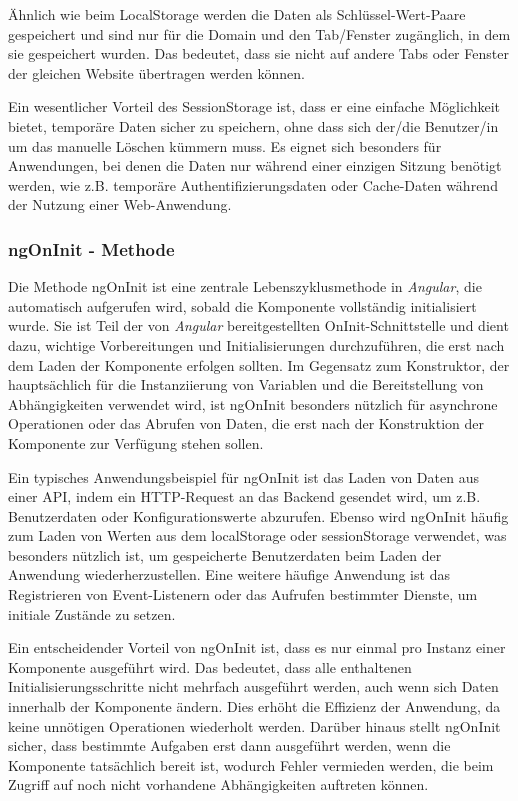 Ähnlich wie beim LocalStorage werden die Daten als Schlüssel-Wert-Paare gespeichert und sind nur für die Domain und den Tab/Fenster zugänglich, in dem sie gespeichert wurden. Das bedeutet, dass sie nicht auf andere Tabs oder Fenster der gleichen Website übertragen werden können.

Ein wesentlicher Vorteil des SessionStorage ist, dass er eine einfache Möglichkeit bietet, temporäre Daten sicher zu speichern, ohne dass sich der/die Benutzer/in um das manuelle Löschen kümmern muss. Es eignet sich besonders für Anwendungen, bei denen die Daten nur während einer einzigen Sitzung benötigt werden, wie z.B. temporäre Authentifizierungsdaten oder Cache-Daten während der Nutzung einer Web-Anwendung.

\subsubsection{ngOnInit - Methode}

Die Methode ngOnInit ist eine zentrale Lebenszyklusmethode in \textit{Angular}, die automatisch aufgerufen wird, sobald die Komponente vollständig initialisiert wurde. Sie ist Teil der von \textit{Angular} bereitgestellten OnInit-Schnittstelle und dient dazu, wichtige Vorbereitungen und Initialisierungen durchzuführen, die erst nach dem Laden der Komponente erfolgen sollten. Im Gegensatz zum Konstruktor, der hauptsächlich für die Instanziierung von Variablen und die Bereitstellung von Abhängigkeiten verwendet wird, ist ngOnInit besonders nützlich für asynchrone Operationen oder das Abrufen von Daten, die erst nach der Konstruktion der Komponente zur Verfügung stehen sollen.

Ein typisches Anwendungsbeispiel für ngOnInit ist das Laden von Daten aus einer API, indem ein HTTP-Request an das Backend gesendet wird, um z.B. Benutzerdaten oder Konfigurationswerte abzurufen. Ebenso wird ngOnInit häufig zum Laden von Werten aus dem localStorage oder sessionStorage verwendet, was besonders nützlich ist, um gespeicherte Benutzerdaten beim Laden der Anwendung wiederherzustellen. Eine weitere häufige Anwendung ist das Registrieren von Event-Listenern oder das Aufrufen bestimmter Dienste, um initiale Zustände zu setzen.

Ein entscheidender Vorteil von ngOnInit ist, dass es nur einmal pro Instanz einer Komponente ausgeführt wird. Das bedeutet, dass alle enthaltenen Initialisierungsschritte nicht mehrfach ausgeführt werden, auch wenn sich Daten innerhalb der Komponente ändern. Dies erhöht die Effizienz der Anwendung, da keine unnötigen Operationen wiederholt werden. Darüber hinaus stellt ngOnInit sicher, dass bestimmte Aufgaben erst dann ausgeführt werden, wenn die Komponente tatsächlich bereit ist, wodurch Fehler vermieden werden, die beim Zugriff auf noch nicht vorhandene Abhängigkeiten auftreten können.

